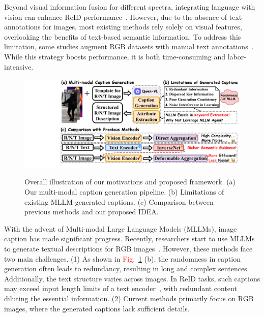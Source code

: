 Beyond visual information fusion for different spectra, integrating language with vision can enhance ReID performance~\cite{han2024clip,wang2024large,niu2025chatreid}.
%
However, due to the absence of text annotations for images, most existing methods rely solely on visual features, overlooking the benefits of text-based semantic information.
%
To address this limitation, some studies augment RGB datasets with manual text annotations~\cite{li2017person,ding2021semantically}.
%
While this strategy boosts performance, it is both time-consuming and labor-intensive.
%
\begin{figure}[t]
  \centering
    \resizebox{0.475\textwidth}{!}
    {
  \includegraphics[width=30\linewidth]{sec/img/LLM_Generation.pdf}
  }
  \vspace{-6mm}
   \caption{Overall illustration of our motivations and proposed framework.
   (a) Our multi-modal caption generation pipeline.
   (b) Limitations of existing MLLM-generated captions.
   (c) Comparison between previous methods and our proposed IDEA.
   }
  \label{fig:LLM}
  \vspace{-3mm}
\end{figure}
With the advent of Multi-modal Large Language Models (MLLMs), image caption has made significant progress. 
%
Recently, researchers start to use MLLMs to generate textual descriptions for RGB images~\cite{han2024clip,he2024instruct}.
%
However, these methods face two main challenges.
%
(1) As shown in \textcolor{red}{Fig.}~\ref{fig:LLM} (b), the randomness in caption generation often leads to redundancy, resulting in long and complex sentences. 
%
Additionally, the text structure varies across images.
%
In ReID tasks, such captions may exceed input length limits of a text encoder~\cite{radford2021learning,zhang2024multimodal}, with redundant content diluting the essential information.
%
(2) Current methods primarily focus on RGB images, where the generated captions lack sufficient details.
